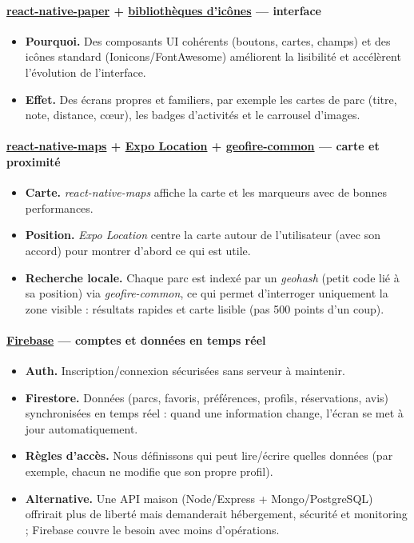 \documentclass[12pt,a4paper]{article}
\begin{document}
\paragraph{\textbf{\href{https://callstack.github.io/react-native-paper}{react-native-paper}} + \textbf{\href{https://icons.expo.fyi}{bibliothèques d’icônes}} — interface}
\begin{itemize}
  \item \textbf{Pourquoi.} Des composants UI cohérents (boutons, cartes, champs) et des icônes standard (Ionicons/FontAwesome) améliorent la lisibilité et accélèrent l’évolution de l’interface.
  \item \textbf{Effet.} Des écrans propres et familiers, par exemple les cartes de parc (titre, note, distance, cœur), les badges d’activités et le carrousel d’images.
\end{itemize}

\paragraph{\textbf{\href{https://github.com/react-native-maps/react-native-maps}{react-native-maps}} + \textbf{\href{https://docs.expo.dev/versions/latest/sdk/location/}{Expo Location}} + \textbf{\href{https://github.com/firebase/geofire-js}{geofire-common}} — carte et proximité}
\begin{itemize}
  \item \textbf{Carte.} \emph{react-native-maps} affiche la carte et les marqueurs avec de bonnes performances.
  \item \textbf{Position.} \emph{Expo Location} centre la carte autour de l’utilisateur (avec son accord) pour montrer d’abord ce qui est utile.
  \item \textbf{Recherche locale.} Chaque parc est indexé par un \emph{geohash} (petit code lié à sa position) via \emph{geofire-common}, ce qui permet d’interroger uniquement la zone visible : résultats rapides et carte lisible (pas 500 points d’un coup).
\end{itemize}

\paragraph{\textbf{\href{https://firebase.google.com}{Firebase}} — comptes et données en temps réel}
\begin{itemize}
  \item \textbf{Auth.} Inscription/connexion sécurisées sans serveur à maintenir.
  \item \textbf{Firestore.} Données (parcs, favoris, préférences, profils, réservations, avis) synchronisées en temps réel : quand une information change, l’écran se met à jour automatiquement.
  \item \textbf{Règles d’accès.} Nous définissons qui peut lire/écrire quelles données (par exemple, chacun ne modifie que son propre profil).
  \item \textbf{Alternative.} Une API maison (Node/Express + Mongo/PostgreSQL) offrirait plus de liberté mais demanderait hébergement, sécurité et monitoring ; Firebase couvre le besoin avec moins d’opérations.
\end{itemize}
\end{document}
